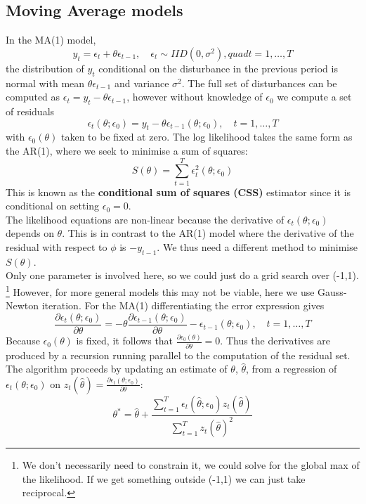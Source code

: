 \documentclass[DIV=14,titlepage=false]{scrreprt}
\begin{document}
\subsection{Moving Average models}
In the MA(1) model,
\[
    y_t = \epsilon_t + \theta \epsilon_{t-1}, \quad \epsilon_t \sim IID(0, \sigma^2), quad t = 1, \dots, T
\]
the distribution of $y_t$ conditional on the disturbance in the previous period is normal with mean $\theta \epsilon_{t-1}$ and variance $\sigma^2$. The full set of disturbances can be computed as $\epsilon_t = y_t - \theta \epsilon_{t-1}$, however without knowledge of $\epsilon_0$ we compute a set of residuals
\[
    \epsilon_t (\theta;\epsilon_0) = y_t - \theta \epsilon_{t-1}(\theta;\epsilon_0), \quad t = 1, \dots, T
\]
with $\epsilon_0(\theta)$ taken to be fixed at zero. The log likelihood takes the same form as the AR(1), where we seek to minimise a sum of squares:
\[
    S(\theta) = \sum_{t=1}^{T} \epsilon_t^2(\theta;\epsilon_0)
\]
This is known as the \textbf{conditional sum of squares (CSS)} estimator since it is conditional on setting $\epsilon_0 = 0$.\\
The likelihood equations are non-linear because the derivative of $\epsilon_t(\theta;\epsilon_0)$ depends on $\theta$. This is in contrast to the AR(1) model where the derivative of the residual with respect to $\phi$ is $-y_{t-1}$. We thus need a different method to minimise $S(\theta)$.\\
Only one parameter is involved here, so we could just do a grid search over (-1,1). \footnote{We don't necessarily need to constrain it, we could solve for the global max of the likelihood. If we get something outside (-1,1) we can just take reciprocal.} However, for more general models this may not be viable, here we use Gauss-Newton iteration. For the MA(1) differentiating the error expression gives 
\[
    \frac{ \partial \epsilon_t(\theta;\epsilon_0)}{\partial \theta} = -\theta \frac{\partial \epsilon_{t-1}(\theta;\epsilon_0)}{\partial \theta} - \epsilon_{t-1}(\theta;\epsilon_0) , \quad t = 1, \dots, T
\]
Because $\epsilon_0(\theta)$ is fixed, it follows that $\frac{\partial \epsilon_0(\theta)}{\partial \theta} = 0$. Thus the derivatives are produced by a recursion running parallel to the computation of the residual set. The algorithm proceeds by updating an estimate of $\theta$, $\hat \theta$, from a regression of $\epsilon_t(\theta;\epsilon_0)$ on $z_t(\hat \theta)= \frac{\partial \epsilon_t(\theta;\epsilon_0)}{\partial \theta}$:
\[
    \theta^*=\hat \theta + \frac{\sum_{t=1}^{T} \epsilon_t(\hat \theta;\epsilon_0) z_t(\hat \theta)}{\sum_{t=1}^{T} z_t(\hat \theta)^2}
\]
\end{document}
